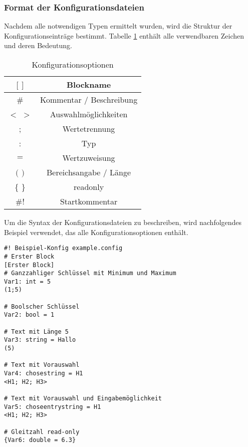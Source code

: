 \subsubsection{Format der Konfigurationsdateien}
Nachdem alle notwendigen Typen ermittelt wurden, wird die Struktur der Konfigurationseinträge bestimmt. Tabelle \ref{tab:Konfigurationsoptionen} enthält alle verwendbaren Zeichen und deren Bedeutung.
\begin{table}[htb]
	\centering
	\caption{Konfigurationsoptionen}
		\begin{tabular}{|c|c|}
			\hline
			$[$ $]$ & Blockname \\ \hline
			\# & Kommentar / Beschreibung \\ \hline
			$<$ $>$ & Auswahlmöglichkeiten \\ \hline
			; & Wertetrennung \\ \hline
			: & Typ \\ \hline
			$=$ & Wertzuweisung \\ \hline
			$($ $)$ & Bereichsangabe / Länge \\ \hline
			\{ \} & readonly \\ \hline
			\#! & Startkommentar \\ \hline
		\end{tabular}
	\label{tab:Konfigurationsoptionen}
\end{table}
Um die Syntax der Konfigurationsdateien zu beschreiben, wird nachfolgendes Beispiel verwendet, das alle Konfigurationsoptionen enthält.
\begin{verbatim}
#! Beispiel-Konfig example.config
# Erster Block
[Erster Block]
# Ganzzahliger Schlüssel mit Minimum und Maximum
Var1: int = 5
(1;5)

# Boolscher Schlüssel
Var2: bool = 1

# Text mit Länge 5
Var3: string = Hallo
(5)

# Text mit Vorauswahl
Var4: chosestring = H1
<H1; H2; H3>

# Text mit Vorauswahl und Eingabemöglichkeit
Var5: choseentrystring = H1
<H1; H2; H3>

# Gleitzahl read-only
{Var6: double = 6.3}
\end{verbatim}


